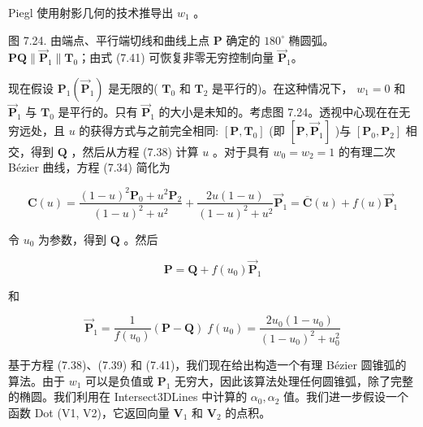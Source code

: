 \documentclass[../main.tex]{subfiles}
\begin{document}
Piegl \cite{Pieg87b} 使用射影几何的技术推导出 \({w}_{1}\) 。

\begin{center}
\begin{minipage}{19cm}
\vspace*{.6\baselineskip}
\centering
{}
\par\smallskip
图 7.24. 由端点、平行端切线和曲线上点 $\mathbf P$ 确定的 $180^\circ$ 椭圆弧。\\
$\mathbf P\mathbf Q\parallel\overrightarrow{\mathbf P}_1\parallel\mathbf T_0$；由式 (7.41) 可恢复非零无穷控制向量 $\overrightarrow{\mathbf P}_1$。
\end{minipage}
\end{center}

现在假设 \({\mathbf{P}}_{1}\left( {\overrightarrow{\mathbf{P}}}_{1}\right)\) 是无限的( \({\mathbf{T}}_{0}\) 和 \({\mathbf{T}}_{2}\) 是平行的)。在这种情况下， \({w}_{1} = 0\) 和 \({\overrightarrow{\mathbf{P}}}_{1}\) 与 \({\mathbf{T}}_{0}\) 是平行的。只有 \({\overrightarrow{\mathbf{P}}}_{1}\) 的大小是未知的。考虑图 7.24。透视中心现在在无穷远处，且 \(u\) 的获得方式与之前完全相同: \(\left\lbrack  {\mathbf{P},{\mathbf{T}}_{0}}\right\rbrack\) (即 \(\left\lbrack  {\mathbf{P},{\overrightarrow{\mathbf{P}}}_{1}}\right\rbrack\) )与 \(\left\lbrack  {{\mathbf{P}}_{0},{\mathbf{P}}_{2}}\right\rbrack\) 相交，得到 \(\mathbf{Q}\) ，然后从方程 (7.38) 计算 \(u\) 。对于具有 \({w}_{0} = {w}_{2} = 1\) 的有理二次 Bézier 曲线，方程 (7.34) 简化为

\[
\mathbf{C}\left( u\right)  = \frac{{\left( 1 - u\right) }^{2}{\mathbf{P}}_{0} + {u}^{2}{\mathbf{P}}_{2}}{{\left( 1 - u\right) }^{2} + {u}^{2}} + \frac{{2u}\left( {1 - u}\right) }{{\left( 1 - u\right) }^{2} + {u}^{2}}{\overrightarrow{\mathbf{P}}}_{1} = \overline{\mathbf{C}}\left( u\right)  + f\left( u\right) {\overrightarrow{\mathbf{P}}}_{1} \tag{7.40}
\]

令 \({u}_{0}\) 为参数，得到 \(\mathbf{Q}\) 。然后

\[
\mathbf{P} = \mathbf{Q} + f\left( {u}_{0}\right) {\overrightarrow{\mathbf{P}}}_{1}
\]

和

\[
{\overrightarrow{\mathbf{P}}}_{1} = \frac{1}{f\left( {u}_{0}\right) }\left( {\mathbf{P} - \mathbf{Q}}\right) \;f\left( {u}_{0}\right)  = \frac{2{u}_{0}\left( {1 - {u}_{0}}\right) }{{\left( 1 - {u}_{0}\right) }^{2} + {u}_{0}^{2}} \tag{7.41}
\]



基于方程 (7.38)、(7.39) 和 (7.41)，我们现在给出构造一个有理 Bézier 圆锥弧的算法。由于 \({w}_{1}\) 可以是负值或 \({\mathbf{P}}_{1}\) 无穷大，因此该算法处理任何圆锥弧，除了完整的椭圆。我们利用在 Intersect3DLines 中计算的 \({\alpha }_{0},{\alpha }_{2}\) 值。我们进一步假设一个函数 Dot (V1, V2)，它返回向量 \({\mathbf{V}}_{1}\) 和 \({\mathbf{V}}_{2}\) 的点积。
\end{document}
